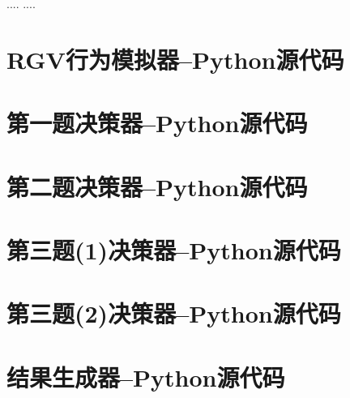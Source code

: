 \documentclass{cumcmthesis}
\begin{document}
\begin{thebibliography}{9}%
  ....
  ....
\end{thebibliography}

\newpage
\begin{appendices}
\section{RGV行为模拟器--Python源代码}

\section{第一题决策器--Python源代码}

\section{第二题决策器--Python源代码}

\section{第三题(1)决策器--Python源代码}

\section{第三题(2)决策器--Python源代码}

\section{结果生成器--Python源代码}



\end{appendices}
\end{document}
